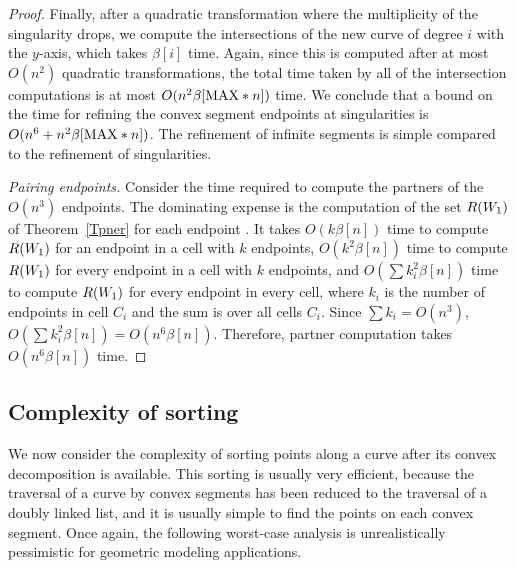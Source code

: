 \begin{proof}
Finally, after a quadratic transformation where the multiplicity of the singularity 
drops, we compute the intersections of the new curve of degree $i$ with the $y$-axis, 
which takes $\beta[i]$ time.
Again, since this is computed after at most $O(n^{2})$ quadratic transformations,
the total time taken by all of the intersection computations is at most 
$O(n^{2} \beta[{\rm MAX} * n])$ time.
We conclude that a bound on the time for refining the
convex segment endpoints at singularities is $O(n^{6} + n^{2} \beta[{\rm MAX} * n])$.
The refinement of infinite segments is simple compared to the refinement of singularities.

{\em Pairing endpoints.}
%
Consider the time required to compute the partners of the $O(n^{3})$ endpoints.
The dominating expense is the computation of the set $R(\mbox{$W_{1}$})$ of 
Theorem~\ref{Tpner} for each endpoint \wo.
It takes $O(k\beta[n])$ time to compute $R(\mbox{$W_{1}$})$ for an endpoint in a cell
with $k$ endpoints, $O(k^{2}\beta[n])$ time to compute $R(\mbox{$W_{1}$})$ for every 
endpoint in a cell with $k$ endpoints, and $O(\sum k_{i}^{2}\beta[n])$
time to compute $R(\mbox{$W_{1}$})$ for every endpoint in every cell, where $k_{i}$ is the
number of endpoints in cell $C_{i}$ and the sum is over all cells $C_{i}$.
Since $\sum k_{i} = O(n^{3})$, $O(\sum k_{i}^{2}\beta[n]) = O(n^{6}\beta[n])$.
Therefore, partner computation takes $O(n^{6}\beta[n])$ time.
\end{proof}

\subsection{Complexity of sorting}

We now consider the complexity of sorting points along a curve after its convex
decomposition is available.
This sorting is usually very efficient, because the traversal of a curve by
convex segments has been reduced to the traversal of a doubly linked list, and
it is usually simple to find the points on each convex segment.
Once again, the following worst-case analysis is unrealistically pessimistic
for geometric modeling applications.

